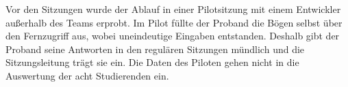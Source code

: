 Vor den Sitzungen wurde der Ablauf in einer Pilotsitzung mit einem Entwickler außerhalb des Teams erprobt. Im Pilot füllte der Proband die Bögen selbst über den Fernzugriff aus, wobei uneindeutige Eingaben entstanden. Deshalb gibt der Proband seine Antworten in den regulären Sitzungen mündlich und die Sitzungsleitung trägt sie ein. Die Daten des Piloten gehen nicht in die Auswertung der acht Studierenden ein.





